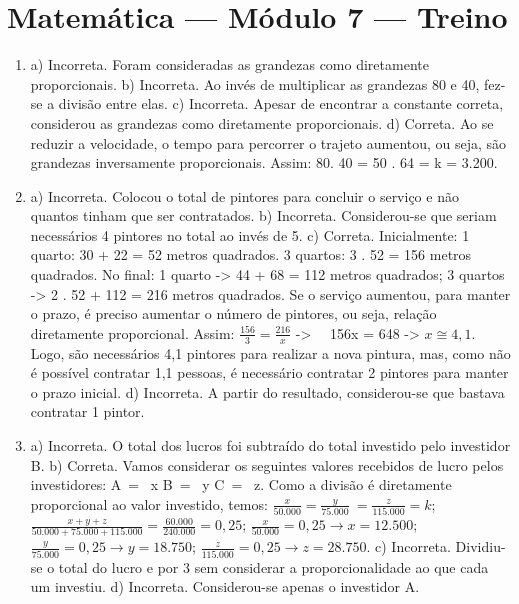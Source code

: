 \section*{Matemática — Módulo 7 — Treino}

\begin{enumerate}
\item a) Incorreta. Foram consideradas as grandezas como diretamente proporcionais.
b) Incorreta. Ao invés de multiplicar as grandezas 80 e 40, fez-se a divisão entre elas.
c) Incorreta. Apesar de encontrar a constante correta, considerou as grandezas como diretamente proporcionais.
d) Correta. Ao se reduzir a velocidade, o tempo para percorrer o trajeto aumentou, ou seja, são grandezas inversamente proporcionais.
Assim: 80. 40 = 50 . 64 = k = 3.200.


\item a) Incorreta. Colocou o total de pintores para concluir o serviço e não quantos tinham que ser contratados.
b) Incorreta. Considerou-se que seriam necessários 4 pintores no total ao invés de 5.
c) Correta. Inicialmente: 1 quarto: 30 + 22 = 52 metros quadrados. 3 quartos:
3 . 52 = 156 metros quadrados. No final: 1 quarto -> 44 + 68 = 112 metros quadrados; 3 quartos -> 2 . 52 + 112 = 216 metros quadrados. Se o serviço aumentou, para manter o prazo, é preciso aumentar o número de pintores, ou seja, relação diretamente proporcional. Assim: $\frac{156}{3} = \frac{216}{x}$  -> \ \ 156x = 648 -> $x \cong 4,1$. Logo, são necessários 4,1 pintores para realizar a nova pintura, mas, como não é possível contratar 1,1 pessoas, é necessário contratar 2
pintores para manter o prazo inicial.
d) Incorreta. A partir do resultado, considerou-se que bastava contratar 1 pintor.

\item a) Incorreta. O total dos lucros foi subtraído do total investido pelo investidor B.
b) Correta. Vamos considerar os seguintes valores recebidos de lucro pelos
investidores: A\  = \ x\; B\  = \ y C\  = \ z. Como a divisão é diretamente proporcional ao valor investido, temos: $\frac{x}{50.000} = \frac{y}{75.000}\  = \frac{z}{115.000} = k$; $\frac{x + y + z}{50.000 + 75.000 + 115.000} = \frac{60.000}{240.000} = 0,25$; $\frac{x}{50.000} = 0,25 \rightarrow x = 12.500$; $\frac{y}{75.000} = 0,25 \rightarrow y = 18.750$; $\frac{z}{115.000} = 0,25 \rightarrow z = 28.750$. 
c) Incorreta. Dividiu-se o total do lucro e  por 3 sem
considerar a proporcionalidade ao que cada um investiu.
d) Incorreta. Considerou-se apenas o investidor A.
\end{enumerate}


